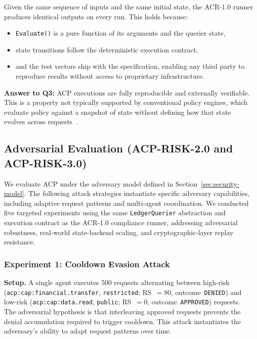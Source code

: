 \documentclass[11pt]{article}
\theoremstyle{definition}
\begin{document}
Given the same sequence of inputs and the same initial state, the ACR-1.0 runner produces identical outputs on every run.
This holds because:

\begin{itemize}[noitemsep]
  \item \texttt{Evaluate()} is a pure function of its arguments and the querier state,
  \item state transitions follow the deterministic execution contract,
  \item and the test vectors ship with the specification, enabling any third party to reproduce results without access to proprietary infrastructure.
\end{itemize}

\noindent\textbf{Answer to Q3:}
ACP executions are fully reproducible and externally verifiable.
This is a property not typically supported by conventional policy engines, which evaluate policy against a snapshot of state without defining how that state evolves across requests~\cite{sandhu1996rbac,hu2015abac,oasis2013xacml}.

\subsection{Adversarial Evaluation (ACP-RISK-2.0 and ACP-RISK-3.0)}
\label{sec:adversarial}

We evaluate ACP under the adversary model defined in Section~\ref{sec:security-model}.
The following attack strategies instantiate specific adversary capabilities,
including adaptive request patterns and multi-agent coordination.
We conducted five targeted experiments using the same \texttt{LedgerQuerier}
abstraction and execution contract as the ACR-1.0 compliance runner,
addressing adversarial robustness, real-world state-backend scaling, and
cryptographic-layer replay resistance.

\subsubsection*{Experiment 1: Cooldown Evasion Attack}

\textbf{Setup.}
A single agent executes 500 requests alternating between high-risk
(\texttt{acp:cap:financial.transfer}, \texttt{restricted}; RS~$=80$,
outcome~\texttt{DENIED}) and low-risk (\texttt{acp:cap:data.read},
\texttt{public}; RS~$=0$, outcome~\texttt{APPROVED}) requests.
The adversarial hypothesis is that interleaving approved requests prevents the
denial accumulation required to trigger cooldown.
This attack instantiates the adversary's ability to adapt request patterns over time.
\end{document}
